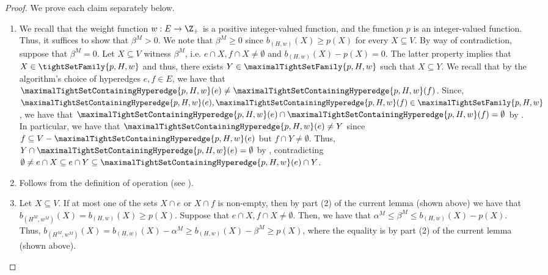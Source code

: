 \begin{proof} We prove each claim separately below.
\begin{enumerate}
    \item We recall that the weight function $w:E\rightarrow\Z_+$ is a positive integer-valued function, and the function $p$ is an integer-valued function. Thus, it suffices to show that $\beta^M > 0$. We note that $\beta^M \geq 0$ since $b_{(H,w)}(X) \ge p(X)$ for every $X \subseteq V$. By way of contradiction, suppose that $\beta^M = 0$. Let $X \subseteq V$ witness $\beta^M$, i.e. $e \cap X, f\cap X \not = \emptyset$ and $b_{(H,w)}(X) -p(X)= 0$.
    The latter property implies that $X \in \tightSetFamily{p, H, w}$ and thus, there exists $Y \in \maximalTightSetFamily{p, H, w}$ such that $X \subseteq Y$. 
    We recall that by the algorithm's choice of hyperedges $e, f \in E$, we have that $\maximalTightSetContainingHyperedge{p, H, w}(e) \not = \maximalTightSetContainingHyperedge{p, H, w}(f)$. Since, $\maximalTightSetContainingHyperedge{p, H, w}(e), \maximalTightSetContainingHyperedge{p, H, w}(f) \in \maximalTightSetFamily{p, H, w}$, we have that $\maximalTightSetContainingHyperedge{p, H, w}(e) \cap \maximalTightSetContainingHyperedge{p, H, w}(f) = \emptyset$ by . In particular, we have that $\maximalTightSetContainingHyperedge{p, H, w}(e) \not = Y$ since
    $f \subseteq V - \maximalTightSetContainingHyperedge{p, H, w}(e)$ but $f \cap Y \not = \emptyset$.
    Thus, $Y\cap \maximalTightSetContainingHyperedge{p, H, w}(e) = \emptyset$ by , contradicting $\emptyset\neq e\cap X\subseteq e \cap Y \subseteq \maximalTightSetContainingHyperedge{p, H, w}(e)\cap Y$. 

    \item Follows from the definition of \merge operation (see ).
    
    \item 
    Let $X \subseteq V$. If at most one of the sets $X\cap e$ or $X\cap f$ is non-empty, then by part (2) of the current lemma (shown above) we have that $b_{(H^M, w^M)}(X) = b_{(H,w)}(X) \geq p(X)$. Suppose that $e\cap X, f\cap X \not = \emptyset$. Then, we have that $\alpha^M \leq \beta^M \leq b_{(H,w)}(X) - p(X)$.
    Thus,  
    $b_{(H^M, w^M)}(X) = b_{(H,w)}(X) - \alpha^M \geq b_{(H,w)}(X) - \beta^M \geq p(X)$, where the equality is by part (2) of the current lemma (shown above).


\end{enumerate}
\end{proof}
